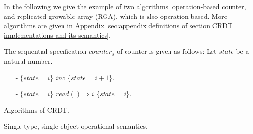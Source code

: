 In the following we give the example of two algorithms: operation-based counter, and replicated growable array (RGA), which is also operation-based. More algorithms are given in Appendix \ref{sec:appendix definitions of section CRDT implementations and its semantics}. 

\begin{example}
\label{definition:operation-based counter}
The sequential specification $\mathit{counter}_s$ of counter is given as follows: Let $\mathit{state}$ be a natural number.

\begin{itemize}
\setlength{\itemsep}{0.5pt}
\item[-] $\{ \mathit{state} = i \}$ $\mathit{inc}$ $\{ \mathit{state} = i+1 \}$.
\item[-] $\{ \mathit{state} = i \}$ $\mathit{read}() \Rightarrow i$ $\{ \mathit{state} = i \}$.
\end{itemize}
\end{example}



Algorithms of CRDT.

Single type, single object operational semantics.





